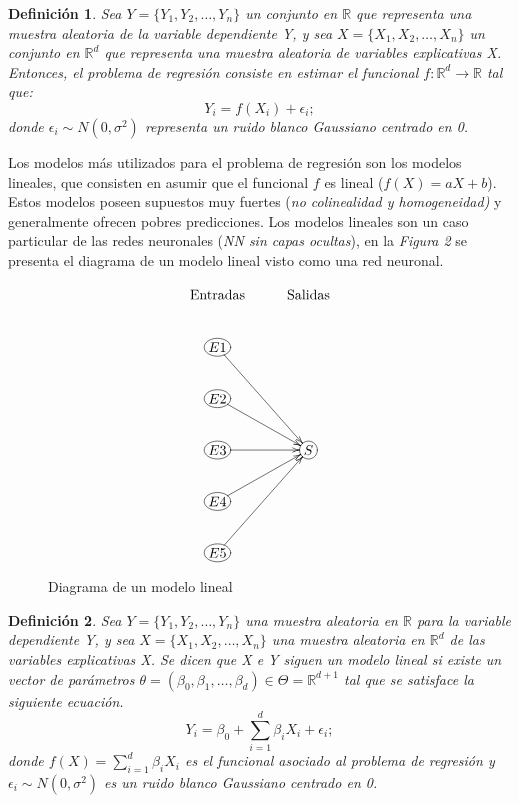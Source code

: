 \documentclass[nojss]{jss}
\newtheorem{Def}{Definición}
\begin{document}
\begin{Def}
	Sea $Y = \{Y_1,Y_2,\ldots,Y_n\}$ un conjunto en $\mathbb{R}$ que representa una muestra aleatoria de la variable dependiente Y, y sea $X = \{X_1,X_2,\ldots,X_n\}$ un conjunto en $\mathbb{R}^d$ que representa una muestra aleatoria de variables explicativas X. Entonces, el problema de regresión consiste en estimar el funcional $f:\mathbb{R}^d \rightarrow \mathbb{R}$ tal que:
	$$Y_i = f(X_i) +\epsilon_i;$$
	donde $\epsilon_i \sim N(0,\sigma^2)$ representa un ruido blanco Gaussiano centrado en 0.
\end{Def}

Los modelos más utilizados para  el problema de regresión son los modelos lineales, que consisten en asumir que el funcional $f$ es lineal ($f(X) = aX +b$). Estos modelos poseen supuestos muy fuertes (\textit{no colinealidad y homogeneidad)} y generalmente ofrecen pobres predicciones. Los modelos lineales son un caso particular de las redes neuronales (\textit{NN sin capas ocultas}), en la \textit{Figura 2} se presenta el diagrama de un modelo lineal visto como una red neuronal.


\begin{figure}[H]
 \centering
 $$
 \xymatrix{
  \text{Entradas}     &\text{Salidas}\\
  *+[o][F]{E1}\ar[ddr]& \\
  *+[o][F]{E2}\ar[dr] & \\
  *+[o][F]{E3}\ar[r]  & *+[o][F]{S}\\
  *+[o][F]{E4}\ar[ur] & \\	
  *+[o][F]{E5}\ar[uur]& \\		
 }
 $$
 \caption[Modelo lineal]{Diagrama de un modelo lineal}
 \label{fig:fig2}
\end{figure}
 
\begin{Def}
	Sea $Y = \{Y_1,Y_2,\ldots,Y_n\}$ una muestra aleatoria en $\mathbb{R}$ para la variable dependiente Y, y sea $X = \{X_1,X_2,\ldots,X_n\}$ una muestra aleatoria en $\mathbb{R}^d$ de las variables explicativas X. Se dicen que X e Y siguen un modelo lineal si existe un vector de parámetros $\theta = (\beta_0,\beta_1, \ldots,\beta_d) \in\Theta = \mathbb{R}^{d+1}$ tal que se satisface la siguiente ecuación.
	$$Y_i = \beta_0 + \sum_{i=1}^d \beta_i X_i +\epsilon_i;$$
	donde $f(X) = \sum_{i=1}^d\beta_iX_i$ es el funcional asociado al problema de regresión y $\epsilon_i \sim N(0,\sigma^2)$ es un ruido blanco Gaussiano centrado en 0.
\end{Def}
 
\end{document}
